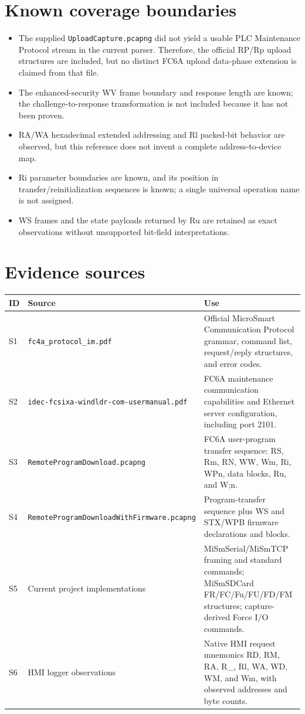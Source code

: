 \documentclass[10pt,letterpaper]{article}
\begin{document}
\section{Known coverage boundaries}
\begin{itemize}
\item The supplied \texttt{UploadCapture.pcapng} did not yield a usable PLC Maintenance Protocol stream in the current parser. Therefore, the official RP/Rp upload structures are included, but no distinct FC6A upload data-phase extension is claimed from that file.
\item The enhanced-security WV frame boundary and response length are known; the challenge-to-response transformation is not included because it has not been proven.
\item RA/WA hexadecimal extended addressing and Rl packed-bit behavior are observed, but this reference does not invent a complete address-to-device map.
\item Ri parameter boundaries are known, and its position in transfer/reinitialization sequences is known; a single universal operation name is not assigned.
\item WS frames and the state payloads returned by Ru are retained as exact observations without unsupported bit-field interpretations.
\end{itemize}

\appendix
\section{Evidence sources}
\begin{longtable}{@{}p{1.2cm}p{5.2cm}p{9.8cm}@{}}
\toprule
ID & Source & Use \\
\midrule
S1 & \texttt{fc4a\_protocol\_im.pdf} & Official MicroSmart Communication Protocol grammar, command list, request/reply structures, and error codes. \\
S2 & \texttt{idec-fcsixa-windldr-}\newline\texttt{com-usermanual.pdf} & FC6A maintenance communication capabilities and Ethernet server configuration, including port 2101. \\
S3 & \texttt{RemoteProgramDownload.pcapng} & FC6A user-program transfer sequence: RS, Rm, RN, WW, Wm, Ri, WPn, data blocks, Ru, and W;n. \\
S4 & \texttt{RemoteProgramDownload}\newline\texttt{WithFirmware.pcapng} & Program-transfer sequence plus WS and STX/WPB firmware declarations and blocks. \\
S5 & Current project implementations & MiSmSerial/MiSmTCP framing and standard commands; MiSmSDCard FR/FC/Fu/FU/FD/FM structures; capture-derived Force I/O commands. \\
S6 & HMI logger observations & Native HMI request mnemonics RD, RM, RA, R\_, Rl, WA, WD, WM, and Wm, with observed addresses and byte counts. \\
\bottomrule
\end{longtable}
\end{document}
